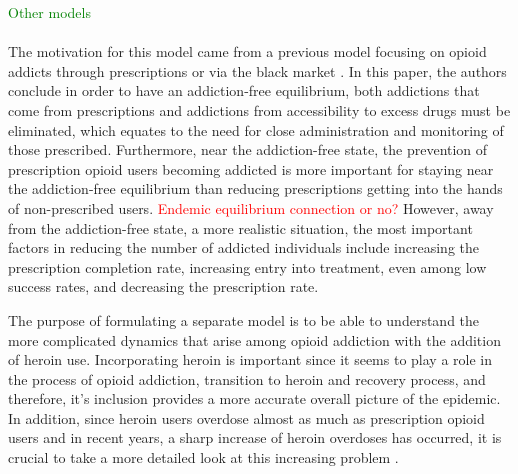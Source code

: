 \documentclass[12pt]{article}
\begin{document}
\textcolor{green}{Other models} \\ \\
The motivation for this model came from a previous model focusing on opioid addicts through prescriptions or via the black market \cite{Battista}. In this paper, the authors conclude in order to have an addiction-free equilibrium, both addictions that come from prescriptions and addictions from accessibility to excess drugs must be eliminated, which equates to the need for close administration and monitoring of those prescribed. Furthermore, near the addiction-free state, the prevention of prescription opioid users becoming addicted is more important for staying near the addiction-free equilibrium than reducing prescriptions getting into the hands of non-prescribed users. \textcolor{red}{Endemic equilibrium connection or no?} However, away from the addiction-free state, a more realistic situation, the most important factors in reducing the number of addicted individuals include increasing the prescription completion rate, increasing entry into treatment, even among low success rates, and decreasing the prescription rate. 

The purpose of formulating a separate model is to be able to understand the more complicated dynamics that arise among opioid addiction with the addition of heroin use. Incorporating heroin is important since it seems to play a role in the process of opioid addiction, transition to heroin and recovery process, and therefore, it's inclusion provides a more accurate overall picture of the epidemic. In addition, since heroin users overdose almost as much as prescription opioid users and in recent years, a sharp increase of heroin overdoses has occurred, it is crucial to take a more detailed look at this increasing problem \cite{CDC4}. 
\end{document}
